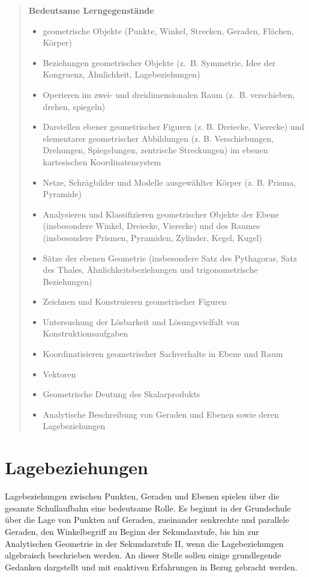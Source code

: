 \documentclass[
]{scrbook}
\providecommand{\tightlist}{%
  \setlength{\itemsep}{0pt}\setlength{\parskip}{0pt}}
\theoremstyle{definition}
\theoremstyle{definition}
\theoremstyle{definition}
\theoremstyle{definition}
\theoremstyle{remark}
\begin{document}
\begin{quote}
\textbf{Bedeutsame Lerngegenstände}

\begin{itemize}
\tightlist
\item
  geometrische Objekte (Punkte, Winkel, Strecken, Geraden, Flächen, Körper)
\item
  Beziehungen geometrischer Objekte (z.~B. Symmetrie, Idee der Kongruenz, Ähnlichkeit, Lagebeziehungen)
\item
  Operieren im zwei- und dreidimensionalen Raum (z.~B. verschieben, drehen, spiegeln)
\item
  Darstellen ebener geometrischer Figuren (z. B. Dreiecke, Vierecke) und elementarer geometrischer Abbildungen (z. B. Verschiebungen, Drehungen, Spiegelungen, zentrische Streckungen) im ebenen kartesischen Koordinatensystem
\item
  Netze, Schrägbilder und Modelle ausgewählter Körper (z. B. Prisma, Pyramide)
\item
  Analysieren und Klassifizieren geometrischer Objekte der Ebene (insbesondere Winkel, Dreiecke, Vierecke) und des Raumes (insbesondere Prismen, Pyramiden, Zylinder, Kegel, Kugel)
\item
  Sätze der ebenen Geometrie (insbesondere Satz des Pythagoras, Satz des Thales, Ähnlichkeitsbeziehungen und trigonometrische Beziehungen)
\item
  Zeichnen und Konstruieren geometrischer Figuren
\item
  Untersuchung der Lösbarkeit und Lösungsvielfalt von Konstruktionsaufgaben
\item
  Koordinatisieren geometrischer Sachverhalte in Ebene und Raum
\item
  Vektoren
\item
  Geometrische Deutung des Skalarprodukts
\item
  Analytische Beschreibung von Geraden und Ebenen sowie deren Lagebeziehungen
\end{itemize}
\end{quote}

\hypertarget{lagebeziehungen}{%
\section{Lagebeziehungen}\label{lagebeziehungen}}

Lagebeziehungen zwischen Punkten, Geraden und Ebenen spielen über die gesamte Schullaufbahn eine bedeutsame Rolle. Es beginnt in der Grundschule über die Lage von Punkten auf Geraden, zueinander senkrechte und parallele Geraden, den Winkelbegriff zu Beginn der Sekundarstufe, bis hin zur Analytischen Geometrie in der Sekundarstufe II, wenn die Lagebeziehungen algebraisch beschrieben werden. An dieser Stelle sollen einige grundlegende Gedanken dargstellt und mit enaktiven Erfahrungen in Bezug gebracht werden.
\end{document}
